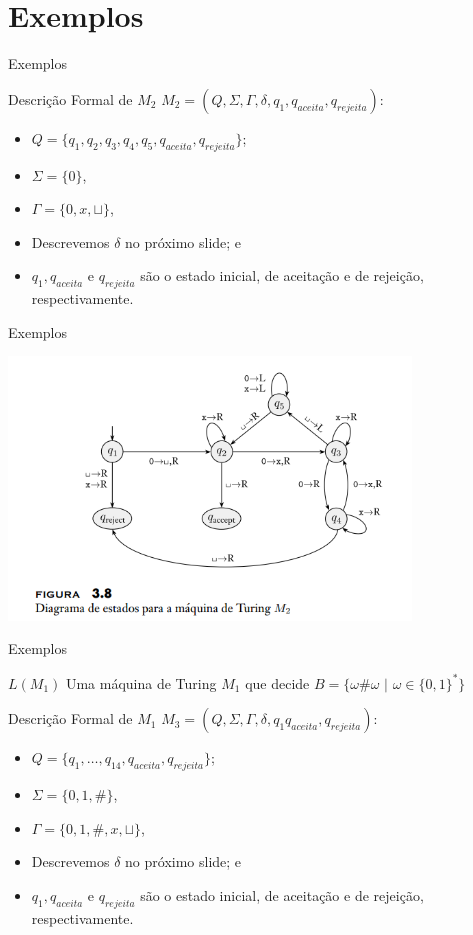 \documentclass[xcolor=dvipsnames,table]{beamer}
\begin{document}
\section{Exemplos}

\begin{frame}{Exemplos}
\begin{block}{Descrição Formal de $M_2$}
$M_2 = (Q, \Sigma, \Gamma, \delta, q_1, q_{aceita}, q_{rejeita})$:
\begin{itemize}
\item $Q = \{ q_1, q_2, q_3, q_4, q_5, q_{aceita}, q_{rejeita} \}$;
\item $\Sigma = \{ 0 \}$,
\item $\Gamma = \{ 0, x, \sqcup \}$,
\item Descrevemos $\delta$ no próximo slide; e
\item $q_1, q_{aceita}$ e $q_{rejeita}$ são o estado inicial, de aceitação e de rejeição, respectivamente.
\end{itemize}
\end{block}
\end{frame}

\begin{frame}{Exemplos}
\begin{center}
\includegraphics[height=7cm]{images/fig38.png}
\end{center}
\end{frame}

\begin{frame}{Exemplos}
\begin{block}{$L(M_1)$}
Uma máquina de Turing $M_1$ que decide $B = \{ \omega \# \omega$ $|$ $\omega \in \{ 0, 1 \}^* \}$		
\end{block} \pause
\begin{block}{Descrição Formal de $M_1$}
$M_3 = (Q, \Sigma, \Gamma, \delta, q_1 q_{aceita}, q_{rejeita})$:
\begin{itemize}
\item $Q = \{ q_1, \ldots, q_{14}, q_{aceita}, q_{rejeita} \}$;
\item $\Sigma = \{ 0, 1, \# \}$,
\item $\Gamma = \{ 0, 1, \#, x, \sqcup \}$,
\item Descrevemos $\delta$ no próximo slide; e
\item $q_1, q_{aceita}$ e $q_{rejeita}$ são o estado inicial, de aceitação e de rejeição, respectivamente.
\end{itemize}
\end{block}
\end{frame}
\end{document}

